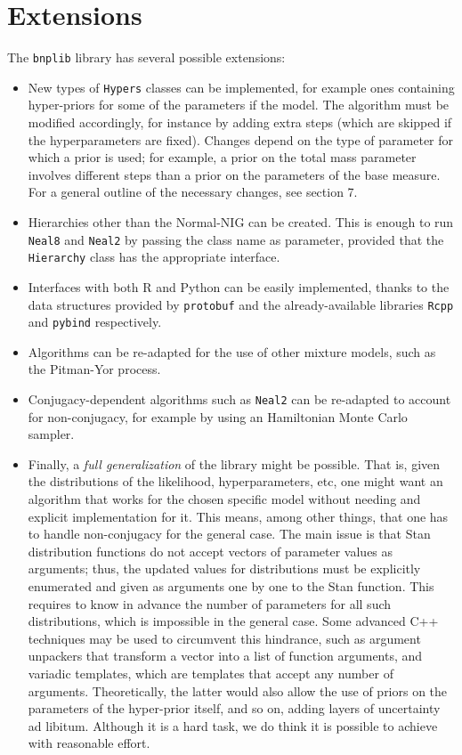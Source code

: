 \section{Extensions}
The \verb|bnplib| library has several possible extensions:
\begin{itemize}
	\item New types of \verb|Hypers| classes can be implemented, for example ones containing hyper-priors for some of the parameters if the model.
	The algorithm must be modified accordingly, for instance by adding extra steps (which are skipped if the hyperparameters are fixed).
	Changes depend on the type of parameter for which a prior is used; for example, a prior on the total mass parameter involves different steps than a prior on the parameters of the base measure.
	For a general outline of the necessary changes, see \cite{neal} section 7.
	\item Hierarchies other than the Normal-NIG can be created.
	This is enough to run \verb|Neal8| and \verb|Neal2| by passing the class name as parameter, provided that the \verb|Hierarchy| class has the appropriate interface.
	\item Interfaces with both R and Python can be easily implemented, thanks to the data structures provided by \verb|protobuf| and the already-available libraries \verb|Rcpp| and \verb|pybind| respectively.
	\item Algorithms can be re-adapted for the use of other mixture models, such as the Pitman-Yor process.
	\item Conjugacy-dependent algorithms such as \verb|Neal2| can be re-adapted to account for non-conjugacy, for example by using an Hamiltonian Monte Carlo sampler.
	\item Finally, a \emph{full generalization} of the library might be possible.
	That is, given the distributions of the likelihood, hyperparameters, etc, one might want an algorithm that works for the chosen specific model without needing and explicit implementation for it.
	This means, among other things, that one has to handle non-conjugacy for the general case.
	The main issue is that Stan distribution functions do not accept vectors of parameter values as arguments; thus, the updated values for distributions must be explicitly enumerated and given as arguments one by one to the Stan function.
	This requires to know in advance the number of parameters for all such distributions, which is impossible in the general case.
	Some advanced C++ techniques may be used to circumvent this hindrance, such as argument unpackers that transform a vector into a list of function arguments, and variadic templates, which are templates that accept any number of arguments.
	Theoretically, the latter would also allow the use of priors on the parameters of the hyper-prior itself, and so on, adding layers of uncertainty ad libitum.
	Although it is a hard task, we do think it is possible to achieve with reasonable effort.
\end{itemize}

